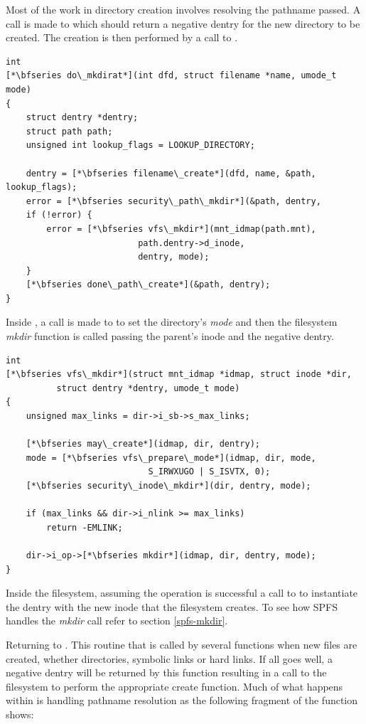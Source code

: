 \noindent
Most of the work in directory creation involves resolving the pathname passed. A call is made to  which should return a negative dentry for the new directory to be created. The creation is then performed by a call to .

\begin{lstlisting}
int 
[*\bfseries do\_mkdirat*](int dfd, struct filename *name, umode_t mode)
{
    struct dentry *dentry;
    struct path path;
    unsigned int lookup_flags = LOOKUP_DIRECTORY;

    dentry = [*\bfseries filename\_create*](dfd, name, &path, lookup_flags);
    error = [*\bfseries security\_path\_mkdir*](&path, dentry,
    if (!error) {
        error = [*\bfseries vfs\_mkdir*](mnt_idmap(path.mnt), 
                          path.dentry->d_inode,
                          dentry, mode);
    }
    [*\bfseries done\_path\_create*](&path, dentry);
}
\end{lstlisting}

\noindent
Inside , a call is made to  to set the directory's \textit{mode} and then the filesystem \textit{mkdir} function is called passing the parent's inode and the negative dentry.

\begin{lstlisting}
int 
[*\bfseries vfs\_mkdir*](struct mnt_idmap *idmap, struct inode *dir,
          struct dentry *dentry, umode_t mode)
{   
    unsigned max_links = dir->i_sb->s_max_links;
    
    [*\bfseries may\_create*](idmap, dir, dentry);
    mode = [*\bfseries vfs\_prepare\_mode*](idmap, dir, mode, 
                            S_IRWXUGO | S_ISVTX, 0);
    [*\bfseries security\_inode\_mkdir*](dir, dentry, mode);
    
    if (max_links && dir->i_nlink >= max_links)
        return -EMLINK;
    
    dir->i_op->[*\bfseries mkdir*](idmap, dir, dentry, mode);
}
\end{lstlisting}

\noindent
Inside the filesystem, assuming the operation is successful a call to  to instantiate the dentry with the new inode that the filesystem creates. To see how SPFS handles the \textit{mkdir} call refer to section \ref{spfs-mkdir}.

Returning to . This routine that is called by several functions when new files are created, whether directories, symbolic links or hard links. If all goes well, a negative dentry will be returned by this function resulting in a call to the filesystem to perform the appropriate create function. Much of what happens within  is handling pathname resolution as the following fragment of the function shows:


